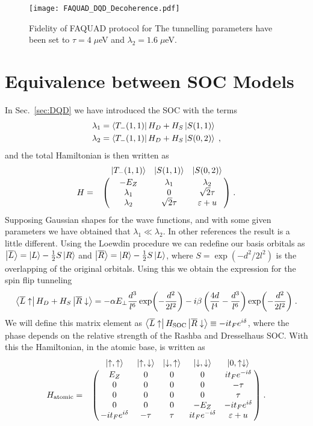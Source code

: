 \documentclass[a4paper,11pt]{article}
\begin{document}
\begin{figure}[!htbp]
	\centering
	\texttt{[image: FAQUAD\_DQD\_Decoherence.pdf]}
	\caption{Fidelity of FAQUAD protocol for  The tunnelling parameters have been set to $\tau=4\; \mu$eV and $\lambda_{2}=1.6\; \mu$eV.}
	\label{fig:FAQUAD_DQD_errors}
\end{figure}
\newpage
\appendix
\section{Equivalence between SOC Models}
In Sec.~\ref{sec:DQD} we have introduced the SOC with the terms
\begin{equation}
	\begin{split}
	\lambda_1&=\bra{T_-(1,1)}H_D+H_S\ket{S(1,1)}\\
	\lambda_2&=\bra{T_-(1,1)}H_D+H_S\ket{S(0,2)}\; ,
	\end{split}
\end{equation}
and the total Hamiltonian is then written as
\begin{equation}
H=\bordermatrix{~ & \ket{T_-(1,1)} & \ket{S(1,1)} & \ket{S(0,2)}\cr
	~ & -E_Z & \lambda_1 & \lambda_2 \cr
	~ & \lambda_1 & 0 & \sqrt{2}\tau \cr
	~ & \lambda_2 & \sqrt{2}\tau & \varepsilon+u \cr}\; .
\label{eq:Hamiltonian_Yue}
\end{equation}
Supposing Gaussian shapes for the wave functions, and with some given parameters we have obtained that $\lambda_1\ll\lambda_2$. In other references \cite{Bogan2018} the result is a little different. Using the Loewdin procedure we can redefine our basis orbitals as $\ket{\overline{L}}=\ket{L}-\frac{1}{2}S\ket{R}$ and $\ket{\overline{R}}=\ket{R}-\frac{1}{2}S\ket{L}$, where $S=\exp(-d^2/2l^2)$ is the overlapping of the original orbitals. Using this we obtain the expression for the spin flip tunneling
\begin{equation}
	\bra{\overline{L}\uparrow}H_D+H_S\ket{\overline{R}\downarrow}=-\alpha E_\perp \frac{d^3}{l^6}\exp(-\frac{d^2}{2l^2})-i\beta\left(\frac{4d}{l^4}-\frac{d^3}{l^6}\right)\exp(-\frac{d^2}{2l^2})\; .
\end{equation}
We will define this matrix element as $\bra{\overline{L}\uparrow}H_{\text{SOC}}\ket{\overline{R}\downarrow}\equiv -it_Fe^{i\delta}$, where the phase depends on the relative strength of the Rashba and Dresselhaus SOC. With this the Hamiltonian, in the atomic base, is written as
\begin{equation}
H_{\text{atomic}}=\bordermatrix{~ & \ket{\uparrow,\uparrow} & \ket{\uparrow,\downarrow} & \ket{\downarrow,\uparrow} & \ket{\downarrow,\downarrow} & \ket{0,\uparrow\downarrow}\cr
	~ & E_Z   			 & 0     & 0    & 0    			   & it_Fe^{-i\delta}  \cr
	~ & 0     			 & 0     & 0    & 0    			   & -\tau  		  	\cr
	~ & 0     			 & 0     & 0    & 0    			   & \tau 		  		\cr
	~ & 0     			 & 0     & 0    & -E_Z 			   & -it_Fe^{i\delta}   \cr
	~ & -it_Fe^{i\delta} & -\tau & \tau & it_Fe^{-i\delta} & \varepsilon+u}\; .
\end{equation}
\end{document}
